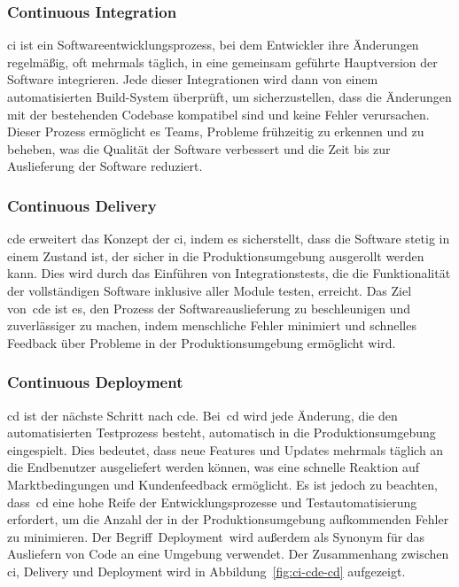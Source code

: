 \subsubsection{Continuous Integration}

\acrfull{ci} ist ein Softwareentwicklungsprozess, bei dem Entwickler ihre Änderungen
regelmäßig, oft mehrmals täglich, in eine gemeinsam geführte Hauptversion der Software integrieren.
Jede dieser Integrationen wird dann von einem automatisierten Build-System überprüft, um sicherzustellen, dass die
Änderungen mit der bestehenden Codebase kompatibel sind und keine Fehler verursachen.
Dieser Prozess ermöglicht es Teams, Probleme frühzeitig zu erkennen und zu beheben, was die Qualität der Software
verbessert und die Zeit bis zur Auslieferung der Software reduziert.

\subsubsection{Continuous Delivery}

\acrfull{cde} erweitert das Konzept der \acrlong{ci}, indem es sicherstellt, dass die
Software stetig in einem Zustand ist, der sicher in die Produktionsumgebung ausgerollt werden kann.
Dies wird durch das Einführen von Integrationstests, die die Funktionalität der vollständigen Software inklusive aller
Module testen, erreicht.
Das Ziel von\ \acrshort{cde} ist es, den Prozess der Softwareauslieferung zu beschleunigen und zuverlässiger zu machen,
indem menschliche Fehler minimiert und schnelles Feedback über Probleme in der Produktionsumgebung ermöglicht wird.

\subsubsection{Continuous Deployment}

\acrfull{cd} ist der nächste Schritt nach \acrlong{cde}.
Bei\ \acrshort{cd} wird jede Änderung, die den automatisierten Testprozess besteht, automatisch in die
Produktionsumgebung eingespielt.
Dies bedeutet, dass neue Features und Updates mehrmals täglich an die Endbenutzer ausgeliefert werden können, was eine
schnelle Reaktion auf Marktbedingungen und Kundenfeedback ermöglicht.
Es ist jedoch zu beachten, dass\ \acrshort{cd} eine hohe Reife der Entwicklungsprozesse und Testautomatisierung
erfordert, um die Anzahl der in der Produktionsumgebung aufkommenden Fehler zu minimieren.
Der Begriff\ \glqq Deployment\grqq\ wird außerdem als Synonym für das Ausliefern von Code an eine Umgebung verwendet.
Der Zusammenhang zwischen \acrlong{ci}, Delivery und Deployment wird in Abbildung\ \ref{fig:ci-cde-cd}
aufgezeigt.

